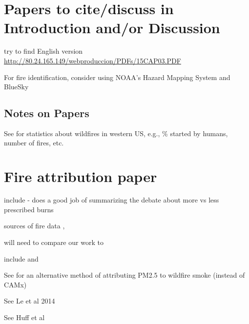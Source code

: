 \section{Papers to cite/discuss in Introduction and/or Discussion}

\cite{westerling_increasing_2016,WesterlingCorrection2016}

try to find English version \url{http://80.24.165.149/webproduccion/PDFs/15CAP03.PDF}

For fire identification, consider using NOAA's Hazard Mapping System and BlueSky

\subsection{Notes on Papers}

See \cite{Fusco2016} for statistics about wildfires in western US, e.g., \% started by humans, number of fires, etc.

\section{Fire attribution paper}

include \cite{long_aligning_2018} - does a good job of summarizing the debate about more vs less prescribed burns

sources of fire data \cite{http://www.nifc.gov/fireInfo/fireInfo_main.html}, \cite{https://fam.nwcg.gov/fam-web/}

will need to compare our work to \cite{fann_health_2017}

include \cite{westerling_increasing_2016,WesterlingCorrection2016} and \cite{abatzoglou_impact_2016}

See \cite{Kaulfus2017} for an alternative method of attributing PM2.5 to wildfire smoke (instead of CAMx)

See Le et al 2014 \cite{http://dx.doi.org/10.3390/ijgi3020713}

See Huff et al \cite{http://dx.doi.org/10.4137/EHI.S19590}